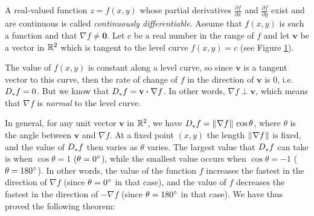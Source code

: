 A real-valued function $z=f(x,y)$ whose partial derivatives $\tfrac{\partial f}{\partial x}$ and
$\frac{\partial f}{\partial y}$ exist and are continuous is called \emph{continuously differentiable}.
Assume that $f(x,y)$ is such a function and that $\nabla f \ne \mathbf{0}$. 
Let $c$ be a real number in the range of
$f$ and let $\mathbf{v}$ be a vector in $\mathbb{R}^{2}$ which is tangent to the
level curve $f(x,y) = c$ (see Figure \ref{fig:gradlevel}).
\begin{figure}[h]
 \begin{center}
 \end{center}
 \caption[]{}
 \label{fig:gradlevel}
\end{figure}

The value of $f(x,y)$ is constant along a level curve, so since $\mathbf{v}$ is a tangent vector to this curve, then
the rate of change of $f$ in the direction of $\mathbf{v}$ is 0, i.e. $D_{\scriptscriptstyle \mathbf{v}}f = 0$. 
But we know that
$D_{\scriptscriptstyle \mathbf{v}}f = \mathbf{v} \bm{\cdot} \nabla f$.
In other words, $\nabla f
\perp \mathbf{v}$, which means that $\nabla f$ is \emph{normal} to the level curve.

In general, for any unit vector $\mathbf{v}$ in $\mathbb{R}^{2}$, we have 
$D_{\scriptscriptstyle \mathbf{v}}f = \lVert\mspace{1mu}\nabla f\mspace{1mu}\rVert\,\cos \theta$, where $\theta$ is the angle between $\mathbf{v}$ and $\nabla f$.
At a fixed point $(x,y)$ the length $\lVert\mspace{1mu}\nabla f\mspace{1mu}\rVert$ is fixed,
and the value of $D_{\scriptscriptstyle \mathbf{v}}f$ then varies as $\theta$ varies. The largest value
that $D_{\scriptscriptstyle \mathbf{v}}f$ can take is when $\cos \theta = 1$ ($\theta = 0^\circ$), while the smallest value occurs
when $\cos \theta = -1$ ($\theta = 180^\circ$). In other words, the value of the function $f$ increases the fastest
in the direction of $\nabla f$ (since $\theta = 0^\circ$ in that case), and the value of $f$ decreases the fastest in
the direction of $-\nabla f$ (since $\theta = 180^\circ$ in that case). We have thus proved the following theorem:

